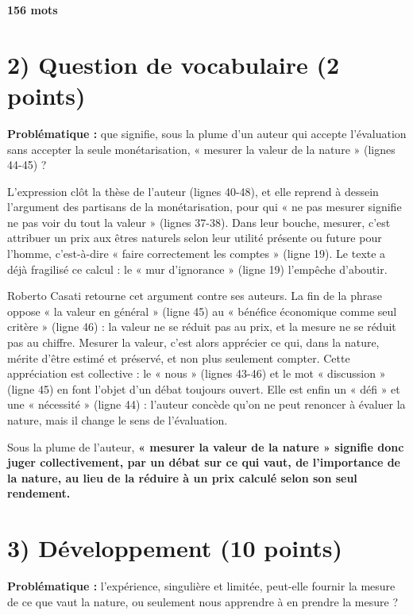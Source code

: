 \documentclass[11pt,a4paper]{article}
\begin{document}
\textbf{156 mots}

\hypertarget{question-de-vocabulaire-2-points}{%
\section{2) Question de vocabulaire (2 points)}\label{question-de-vocabulaire-2-points}}

\textbf{Problématique :} que signifie, sous la plume d'un auteur qui accepte l'évaluation sans accepter la seule monétarisation, « mesurer la valeur de la nature » (lignes 44-45) ?

L'expression clôt la thèse de l'auteur (lignes 40-48), et elle reprend à dessein l'argument des partisans de la monétarisation, pour qui « ne pas mesurer signifie ne pas voir du tout la valeur » (lignes 37-38). Dans leur bouche, mesurer, c'est attribuer un prix aux êtres naturels selon leur utilité présente ou future pour l'homme, c'est-à-dire « faire correctement les comptes » (ligne 19). Le texte a déjà fragilisé ce calcul : le « mur d'ignorance » (ligne 19) l'empêche d'aboutir.

Roberto Casati retourne cet argument contre ses auteurs. La fin de la phrase oppose « la valeur en général » (ligne 45) au « bénéfice économique comme seul critère » (ligne 46) : la valeur ne se réduit pas au prix, et la mesure ne se réduit pas au chiffre. Mesurer la valeur, c'est alors apprécier ce qui, dans la nature, mérite d'être estimé et préservé, et non plus seulement compter. Cette appréciation est collective : le « nous » (lignes 43-46) et le mot « discussion » (ligne 45) en font l'objet d'un débat toujours ouvert. Elle est enfin un « défi » et une « nécessité » (ligne 44) : l'auteur concède qu'on ne peut renoncer à évaluer la nature, mais il change le sens de l'évaluation.

Sous la plume de l'auteur, \textbf{« mesurer la valeur de la nature » signifie donc juger collectivement, par un débat sur ce qui vaut, de l'importance de la nature, au lieu de la réduire à un prix calculé selon son seul rendement.}

\hypertarget{duxe9veloppement-10-points}{%
\section{3) Développement (10 points)}\label{duxe9veloppement-10-points}}

\textbf{Problématique :} l'expérience, singulière et limitée, peut-elle fournir la mesure de ce que vaut la nature, ou seulement nous apprendre à en prendre la mesure ?
\end{document}
